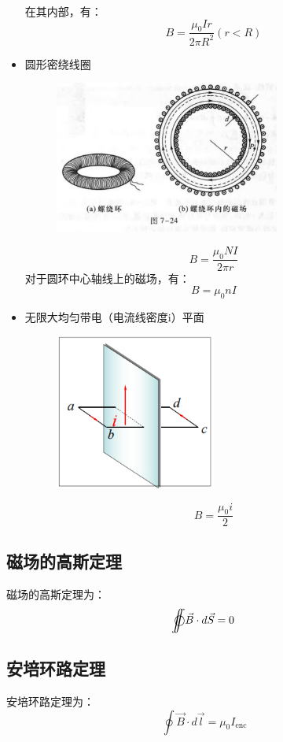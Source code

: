 \documentclass{ctexart}
\def\ooint{{\bigcirc}\kern-12.5pt{\int}\kern-7.5pt{\int}}
\begin{document}
\begin{itemize}
\begin{figure}[H]
    \end{figure}
    在其内部，有：
    $$
        B = \frac{\mu_0 Ir}{2\pi R^2} (r<R)
    $$
    \item 圆形密绕线圈
    \begin{figure}[H]
        \centering
        \includegraphics[width=0.7\textwidth]{img/7-24.jpg}
    \end{figure}
    $$
        B = \frac{\mu_0 N I}{2\pi r}
    $$
    对于圆环中心轴线上的磁场，有：
    $$
        B = \mu_0 n I
    $$
    \item 无限大均匀带电（电流线密度i）平面
    \begin{figure}[H]
        \centering
        \includegraphics[width=0.5\textwidth]{img/ci.png}
    \end{figure}
    $$
        B = \frac{\mu_0 i}{2}
    $$
\end{itemize}
\subsection{磁场的高斯定理}
磁场的高斯定理为：
$$
    \ooint \vec{B} \cdot d\vec{S} = 0
$$
\subsection{安培环路定理}
安培环路定理为：
$$
    \oint \vec{B} \cdot d\vec{l} = \mu_0 I_{\text{enc}}
$$
\end{document}
